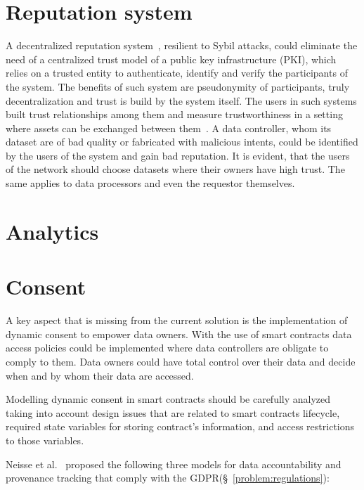 \section{Reputation system}
\label{future_work:ranking_system}

A decentralized reputation system~\cite{trust_is_risk}, resilient to Sybil attacks, could eliminate the need of a centralized trust model of a public key infrastructure (PKI), which relies on a trusted entity to authenticate, identify and verify the participants of the system. The benefits of such system are pseudonymity of participants, truly decentralization and trust is build by the system itself. The users in such systems built trust relationships among them and measure trustworthiness in a setting where assets can be exchanged between them~\cite{trust_is_risk}. A data controller, whom its dataset are of bad quality or fabricated with malicious intents, could be identified by the users of the system and gain bad reputation. It is evident, that the users of the network should choose datasets where their owners have high trust. The same applies to data processors and even the requestor themselves.

\section{Analytics}
\label{future_work:analytics}

\section{Consent}
\label{future_work:consent}

A key aspect that is missing from the current solution is the implementation of dynamic consent to empower data owners. With the use of smart contracts data access policies could be implemented where data controllers are obligate to comply to them. Data owners could have total control over their data and decide when and by whom their data are accessed.

Modelling dynamic consent in smart contracts should be carefully analyzed taking into account design issues that are related to smart contracts lifecycle, required state variables for storing contract’s information, and access restrictions to those variables.

Neisse et al.~\cite{DBLP:journals/corr/NeisseSF17} proposed the following three models for data accountability and provenance tracking that comply with the GDPR(§~\ref{problem:regulations}):

